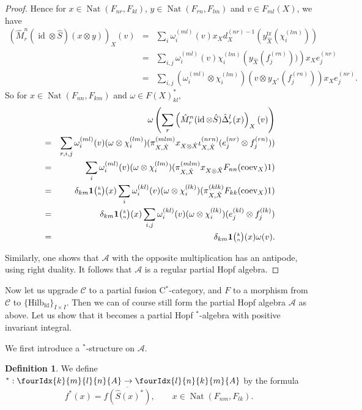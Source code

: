 \documentclass[10pt]{article}
\DeclareMathOperator{\fin}{\mathrm{fd}}
\DeclareMathOperator{\id}{id}
\DeclareMathOperator{\Nat}{\mathrm{Nat}}
\DeclareMathOperator{\tr}{\mathrm{tr}}
\newcommand{\CatCC}{\mathscr{C}}
\newcommand{\Hilb}{\mathrm{Hilb}}
\newcommand{\coev}{\mathrm{coev}}
\newcommand{\Grt}[3]{#1{\tiny {\begin{pmatrix} #2\\#3\end{pmatrix}}}}
\newcommand{\UnitC}[2]{\Grt{\mathbf{1}}{#1}{#2}}
\newcommand{\Gr}[5]{\fourIdx{#2}{#4}{#3}{#5}{#1}}%
\theoremstyle{definition}
\newtheorem{Def}[Theorem]{Definition}
\numberwithin{equation}{section}
\begin{document}
\begin{proof}
Hence for $x\in \Nat(F_{nr},F_{kl})$, $y\in \Nat(F_{rn},F_{lm})$ and $v \in F_{ml}(X)$, we have \begin{eqnarray*} \left(\hat{M}^n_r(\id\otimes \hat{S})(x\otimes y)\right)_X(v) &=& \sum_i \omega_i^{(ml)}\left(v\right)  x_Xd_X^{(nr)-1}(y_{\hat{X}}^{\tr}(\chi_i^{(lm)}))\\ &=& \sum_{i,j} \omega_i^{(ml)}\left(v\right)  \chi_i^{(lm)}\left(y_{\hat{X}}(f_j^{(rn)}))\right)x_Xe_j^{(nr)} \\ &=& \sum_{i,j}(\omega_i^{(ml)}\otimes \chi_i^{(lm)})\left(v\otimes y_{X^*}(f_j^{(rn)})\right)x_Xe_j^{(nr)}.\end{eqnarray*} So for $ x\in \Nat(F_{nn},F_{km})$ and $\omega \in F(X)_{kl}^*$,  \begin{eqnarray*} && \hspace{-2cm} \omega\left(\sum_r\left(\hat{M}^n_r(\id\otimes \hat{S})\hat{\Delta}^l_r(x)\right)_X(v) \right) \\ &=& \sum_{r,i,j}
\omega_i^{(ml)}(v)(\omega\otimes \chi_i^{(lm)})(\pi_{X,\hat{X}}^{(mlm)}x_{X\otimes \hat{X}}\iota_{X,\hat{X}}^{(nrn)}(e_j^{(nr)}\otimes f_j^{(rn)})) \\
&=&  \sum_{i}
\omega_i^{(ml)}(v)(\omega\otimes \chi_i^{(lm)})(\pi_{X,\hat{X}}^{(mlm)}x_{X\otimes \hat{X}}F_{nn}(\coev_X)1)\\ &=&  \delta_{km} \UnitC{k}{n}(x)  \sum_{i}
\omega_i^{(kl)}(v)(\omega\otimes \chi_i^{(lk)})(\pi_{X,\hat{X}}^{(klk)}F_{kk}(\coev_X)1) \\ &=&  \delta_{km} \UnitC{k}{n}(x)  \sum_{i,j}
\omega_i^{(kl)}(v)(\omega\otimes \chi_i^{(lk)})(e_j^{(kl)}\otimes f_j^{(lk)}) \\ &=&  \delta_{km} \UnitC{k}{n}(x)  \omega(v).
\end{eqnarray*}

Similarly, one shows that $\mathscr{A}$ with the opposite multiplication has an antipode, using right duality. It follows that $\mathscr{A}$ is a regular partial Hopf algebra.  
\end{proof} 

Now let us upgrade $\CatCC$ to a partial fusion C$^*$-category, and $F$ to a morphism from $\CatCC$ to $\{\Hilb_{\fin}\}_{I\times I}$. Then we can of course still form the partial Hopf algebra $\mathscr{A}$ as above. Let us show that it becomes a partial Hopf $^*$-algebra with positive invariant integral.

We first introduce a $^*$-structure on $\mathscr{A}$. 

\begin{Def} We define $^*: \Gr{A}{k}{l}{m}{n}\rightarrow \Gr{A}{l}{k}{n}{m}$ by the formula \[f^*(x) = \overline{f(\hat{S}(x)^*)},\qquad x\in \Nat(F_{nm},F_{lk}).\]
\end{Def}
\end{document}
